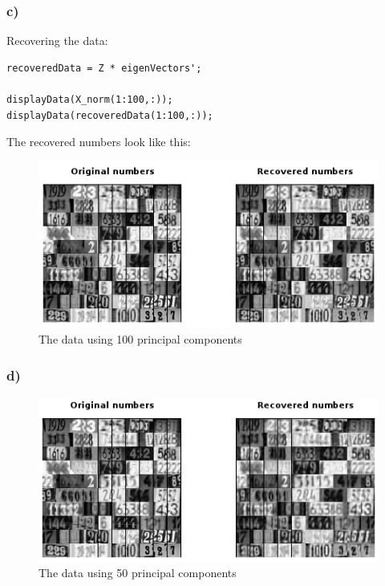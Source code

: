 \subsubsection{c)}

Recovering the data:

\begin{lstlisting}[caption=Problem 3.7 c)]
recoveredData = Z * eigenVectors';

displayData(X_norm(1:100,:));
displayData(recoveredData(1:100,:));
\end{lstlisting}

The recovered numbers look like this:

\begin{figure}[!ht]
\includegraphics[width=1\textwidth]{chapters/images/figure-3-7-c}
\caption{The data using 100 principal components}
\end{figure}


\subsubsection{d)}

\begin{figure}[!ht]
\includegraphics[width=1\textwidth]{chapters/images/figure-3-7-d1}
\caption{The data using 50 principal components}
\end{figure}

